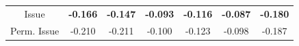 \documentclass{beamer}
\begin{document}
{\begin{tabular}{|c|cccccc|}
    Issue
    & \hspace{-4pt} \textbf{-0.166} \hspace{-5pt}
    & \hspace{-4pt} \textbf{-0.147} \hspace{-5pt}
    & \hspace{-4pt} \textbf{-0.093} \hspace{-5pt}
    & \hspace{-4pt} \textbf{-0.116} \hspace{-5pt}
    & \hspace{-4pt} \textbf{-0.087} \hspace{-5pt}
    & \hspace{-4pt} \textbf{-0.180} \hspace{-4pt} \\
    \hspace{-5pt} Perm. Issue \hspace{-5pt}
    & \hspace{-4pt} -0.210 \hspace{-5pt}
    & \hspace{-4pt} -0.211 \hspace{-5pt}
    & \hspace{-4pt} -0.100 \hspace{-5pt}
    & \hspace{-4pt} -0.123 \hspace{-5pt}
    & \hspace{-4pt} -0.098 \hspace{-5pt}
    & \hspace{-4pt} -0.187 \hspace{-4pt} \\
    \hline
  \end{tabular}
}
\end{document}
